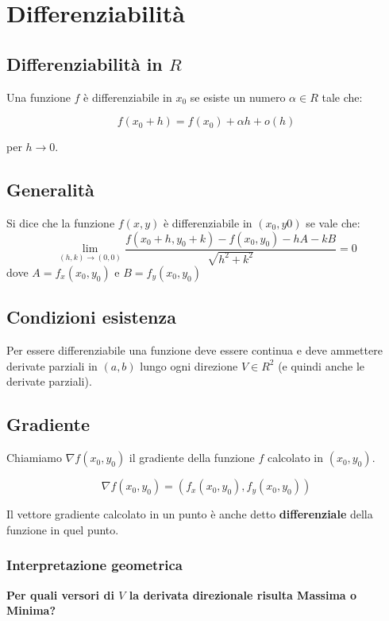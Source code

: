 \section{Differenziabilità}

\subsection{Differenziabilità in $R$}

Una funzione $f$ è differenziabile in $x_0$ se esiste un numero $\alpha \in R$ tale che:

$$f(x_0+h)=f(x_0)+\alpha h + o(h)$$

per $h \to 0$.
 
\subsection{Generalità}

Si dice che la funzione $f(x,y)$ è differenziabile in $(x_0,y0)$ se vale che: 
$$
\lim_{(h,k)\to (0,0)} \frac{f(x_0+h,y_0+k) - f(x_0,y_0) - h A - k B}{\sqrt{h^2+k^2}} = 0
$$
dove $A=f_x(x_0,y_0)$ e $B=f_y(x_0,y_0)$

\subsection{Condizioni esistenza}

Per essere differenziabile una funzione deve essere continua e deve ammettere derivate parziali in $(a,b)$ lungo ogni direzione $V \in R^2$ (e quindi anche le derivate parziali).

\subsection{Gradiente}

Chiamiamo $\nabla f(x_0,y_0)$ il gradiente della funzione $f$ calcolato in $(x_0,y_0)$. 

$$ \nabla f(x_0,y_0) = (f_x(x_0,y_0),f_y(x_0,y_0))$$

Il vettore gradiente calcolato in un punto è anche detto \textbf{differenziale} della funzione in quel punto.

\subsubsection{Interpretazione geometrica}

\textbf{Per quali versori di $V$ la derivata direzionale risulta Massima o Minima?}

